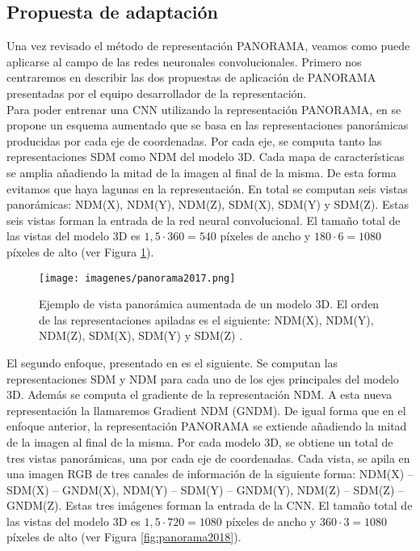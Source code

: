 \subsection{Propuesta de adaptación}

Una vez revisado el método de representación PANORAMA, veamos como puede aplicarse al campo de las redes neuronales convolucionales. Primero nos centraremos en describir las dos propuestas de aplicación de PANORAMA presentadas por el equipo desarrollador de la representación.\\

Para poder entrenar una CNN utilizando la representación PANORAMA, en \cite{sfikas2017exploiting} se propone un esquema aumentado que se basa en las representaciones panorámicas producidas por cada eje de coordenadas. Por cada eje, se computa tanto las representaciones SDM como NDM del modelo 3D. Cada mapa de características se amplia añadiendo la mitad de la imagen al final de la misma. De esta forma evitamos que haya lagunas en la representación. En total se computan seis vistas panorámicas: NDM(X), NDM(Y), NDM(Z), SDM(X), SDM(Y) y SDM(Z). Estas seis vistas forman la entrada de la red neural convolucional. El tamaño total de las vistas del modelo 3D es $1,5 \cdot 360 = 540$ píxeles de ancho y $180 \cdot 6 = 1080$ píxeles de alto (ver Figura \ref{fig:panorama2017}).\\

\begin{figure}[ht!]
    \centering
    \texttt{[image: imagenes/panorama2017.png]}
    \caption[Ejemplo de vista panorámica aumentada de un modelo 3D.]{Ejemplo de vista panorámica aumentada de un modelo 3D. El orden de las representaciones apiladas es el siguiente: NDM(X), NDM(Y), NDM(Z), SDM(X), SDM(Y) y SDM(Z) \cite{sfikas2017exploiting}.}
    \label{fig:panorama2017}
\end{figure}

El segundo enfoque, presentado en \cite{SFIKAS2018208} es el siguiente. Se computan las representaciones SDM y NDM para cada uno de los ejes principales del modelo 3D. Además se computa el gradiente de la representación NDM. A esta nueva representación la llamaremos Gradient NDM (GNDM). De igual forma que en el enfoque anterior, la representación PANORAMA se extiende añadiendo la mitad de la imagen al final de la misma. Por cada modelo 3D, se obtiene un total de tres vistas panorámicas, una por cada eje de coordenadas. Cada vista, se apila en una imagen RGB de tres canales de información de la siguiente forma: NDM(X) – SDM(X) – GNDM(X), NDM(Y) – SDM(Y) – GNDM(Y), NDM(Z) – SDM(Z) – GNDM(Z). Estas tres imágenes forman la entrada de la CNN. El tamaño total de las vistas del modelo 3D es $1,5 \cdot 720 = 1080$ píxeles de ancho y $360 \cdot 3 = 1080$ píxeles de alto (ver Figura \ref{fig:panorama2018}).\\

